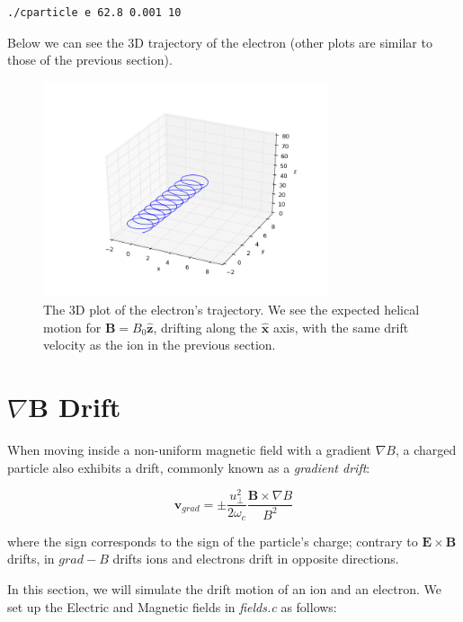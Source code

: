 \documentclass[11pt]{report}
\begin{document}
\begin{lstlisting}
./cparticle e 62.8 0.001 10
\end{lstlisting}

Below we can see the 3D trajectory of the electron (other plots are similar to those of the previous section).

\begin{figure}[!ht]
  \centering
    \includegraphics[width=0.75\textwidth]{images/drift_electron_3d}
     \caption{The 3D plot of the electron's trajectory. We see the expected helical motion for $\bm{B} = B_0 \hat{\bm{z}}$, drifting along the $\hat{\bm{x}}$ axis, with the same drift velocity as the ion in the previous section.}
\end{figure}

\section{$\nabla \bm{B}$ Drift}
When moving inside a non-uniform magnetic field with a gradient $\nabla B$, a charged particle also exhibits a drift, commonly known as a \emph{gradient drift}:

\begin{equation}
\bm{v}_{grad} = \pm \frac{u_{\bot}^2}{2\omega _c} \frac{\bm{B} \times \nabla B}{B^2}
\end{equation}

where the sign corresponds to the sign of the particle's charge; contrary to $\bm{E} \times \bm{B}$ drifts, in $grad-B$ drifts ions and electrons drift in opposite directions.
\newline

In this section, we will simulate the drift motion of an ion and an electron. We set up the Electric and Magnetic fields in \emph{fields.c} as follows: 
\end{document}
